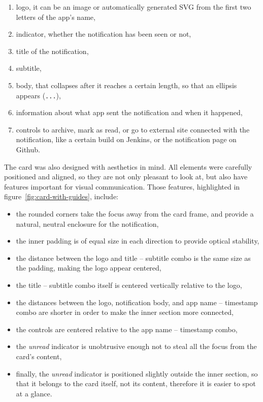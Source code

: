 \begin{enumerate}
      \item
            logo,
            it can be an image
            or automatically generated SVG
            from the first two letters of the app's name,
      \item
            indicator,
            whether the notification has been seen or not,
      \item
            title of the notification,
      \item
            subtitle,
      \item
            body,
            that collapses after it reaches a certain length,
            so that an ellipsis appears (\texttt{...}),
      \item
            information about what app sent the notification and when it happened,
      \item
            controls to archive,
            mark as read,
            or go to external site connected with the notification,
            like a certain build on Jenkins,
            or the notification page on Github.
\end{enumerate}

The card was also designed with aesthetics in mind.
All elements were carefully positioned and aligned,
so they are not only pleasant to look at,
but also have features important for visual communication.
Those features, highlighted in figure~\ref{fig:card-with-guides}, include:

\begin{itemize}
      \item
            the rounded corners take the focus away from the card frame,
            and provide a natural, neutral enclosure for the notification,
      \item
            the inner padding is of equal size in each direction
            to provide optical stability,
      \item
            the distance between the logo and title -- subtitle combo
            is the same size as the padding,
            making the logo appear centered,
      \item
            the title -- subtitle combo itself
            is centered vertically relative to the logo,
      \item
            the distances between the logo,
            notification body, and app name -- timestamp combo are shorter
            in order to make the inner section more connected,
      \item
            the controls are centered relative to the app name -- timestamp combo,
      \item
            the \textit{unread} indicator is unobtrusive enough
            not to steal all the focus from the card's content,
      \item
            finally, the \textit{unread} indicator
            is positioned slightly outside the inner section,
            so that it belongs to the card itself,
            not its content,
            therefore it is easier to spot at a glance.
\end{itemize}

